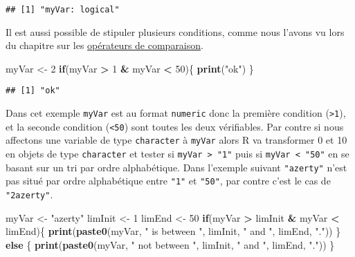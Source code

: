 \documentclass[]{book}
\newenvironment{Shaded}{\begin{snugshade}}{\end{snugshade}}
\newcommand{\KeywordTok}[1]{\textcolor[rgb]{0.13,0.29,0.53}{\textbf{#1}}}
\newcommand{\DecValTok}[1]{\textcolor[rgb]{0.00,0.00,0.81}{#1}}
\newcommand{\StringTok}[1]{\textcolor[rgb]{0.31,0.60,0.02}{#1}}
\newcommand{\ControlFlowTok}[1]{\textcolor[rgb]{0.13,0.29,0.53}{\textbf{#1}}}
\newcommand{\OperatorTok}[1]{\textcolor[rgb]{0.81,0.36,0.00}{\textbf{#1}}}
\newcommand{\NormalTok}[1]{#1}
\theoremstyle{definition}
\theoremstyle{definition}
\theoremstyle{definition}
\theoremstyle{remark}
\begin{document}
\begin{verbatim}
## [1] "myVar: logical"
\end{verbatim}

Il est aussi possible de stipuler plusieurs conditions, comme nous
l'avons vu lors du chapitre sur les
\protect\hyperlink{l011opcomp}{opérateurs de comparaison}.

\begin{Shaded}
\begin{Highlighting}[]
\NormalTok{myVar <-}\StringTok{ }\DecValTok{2}
\ControlFlowTok{if}\NormalTok{(myVar }\OperatorTok{>}\StringTok{ }\DecValTok{1} \OperatorTok{&}\StringTok{ }\NormalTok{myVar }\OperatorTok{<}\StringTok{ }\DecValTok{50}\NormalTok{)\{}
  \KeywordTok{print}\NormalTok{(}\StringTok{"ok"}\NormalTok{)}
\NormalTok{\}}
\end{Highlighting}
\end{Shaded}

\begin{verbatim}
## [1] "ok"
\end{verbatim}

Dans cet exemple \texttt{myVar} est au format \texttt{numeric} donc la
première condition (\texttt{\textgreater{}1}), et la seconde condition
(\texttt{\textless{}50}) sont toutes les deux vérifiables. Par contre si
nous affectons une variable de type \texttt{character} à \texttt{myVar}
alors R va transformer 0 et 10 en objets de type \texttt{character} et
tester si \texttt{myVar\ \textgreater{}\ "1"} puis si
\texttt{myVar\ \textless{}\ "50"} en se basant sur un tri par ordre
alphabétique. Dans l'exemple suivant \texttt{"azerty"} n'est pas situé
par ordre alphabétique entre \texttt{"1"} et \texttt{"50"}, par contre
c'est le cas de \texttt{"2azerty"}.

\begin{Shaded}
\begin{Highlighting}[]
\NormalTok{myVar <-}\StringTok{ "azerty"}
\NormalTok{limInit <-}\StringTok{ }\DecValTok{1}
\NormalTok{limEnd <-}\StringTok{ }\DecValTok{50}
\ControlFlowTok{if}\NormalTok{(myVar }\OperatorTok{>}\StringTok{ }\NormalTok{limInit }\OperatorTok{&}\StringTok{ }\NormalTok{myVar }\OperatorTok{<}\StringTok{ }\NormalTok{limEnd)\{}
  \KeywordTok{print}\NormalTok{(}\KeywordTok{paste0}\NormalTok{(myVar, }\StringTok{" is between "}\NormalTok{, limInit, }\StringTok{" and "}\NormalTok{, limEnd, }\StringTok{"."}\NormalTok{))}
\NormalTok{\} }\ControlFlowTok{else}\NormalTok{ \{}
  \KeywordTok{print}\NormalTok{(}\KeywordTok{paste0}\NormalTok{(myVar, }\StringTok{" not between "}\NormalTok{, limInit, }\StringTok{" and "}\NormalTok{, limEnd, }\StringTok{"."}\NormalTok{))}
\NormalTok{\}}
\end{Highlighting}
\end{Shaded}
\end{document}
